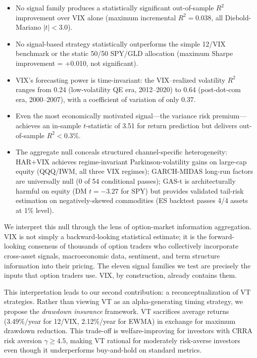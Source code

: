 \documentclass[12pt,a4paper]{article}
\begin{document}
\begin{itemize}
    \item No signal family produces a statistically significant out-of-sample $R^2$ improvement over VIX alone (maximum incremental $R^2 = 0.038$, all Diebold-Mariano $|t| < 3.0$).
    \item No signal-based strategy statistically outperforms the simple 12/VIX benchmark or the static 50/50 SPY/GLD allocation (maximum Sharpe improvement = +0.010, not significant).
    \item VIX's forecasting power is time-invariant: the VIX--realized volatility $R^2$ ranges from 0.24 (low-volatility QE era, 2012--2020) to 0.64 (post-dot-com era, 2000--2007), with a coefficient of variation of only 0.37.
    \item Even the most economically motivated signal---the variance risk premium---achieves an in-sample $t$-statistic of 3.51 for return prediction but delivers out-of-sample $R^2 < 0.3\%$.
    \item The aggregate null conceals structured channel-specific heterogeneity: HAR+VIX achieves regime-invariant Parkinson-volatility gains on large-cap equity (QQQ/IWM, all three VIX regimes); GARCH-MIDAS long-run factors are universally null (0 of 54 conditional passes); GAS-t is architecturally harmful on equity (DM $t = -3.27$ for SPY) but provides validated tail-risk estimation on negatively-skewed commodities (ES backtest passes 4/4 assets at 1\% level).
\end{itemize}

We interpret this null through the lens of option-market information aggregation. VIX is not simply a backward-looking statistical estimate; it is the forward-looking consensus of thousands of option traders who collectively incorporate cross-asset signals, macroeconomic data, sentiment, and term structure information into their pricing. The eleven signal families we test are precisely the inputs that option traders use. VIX, by construction, already contains them.

This interpretation leads to our second contribution: a reconceptualization of VT strategies. Rather than viewing VT as an alpha-generating timing strategy, we propose the \emph{drawdown insurance} framework. VT sacrifices average returns (3.49\%/year for 12/VIX, 2.12\%/year for EWMA) in exchange for maximum drawdown reduction. This trade-off is welfare-improving for investors with CRRA risk aversion $\gamma \geq 4.5$, making VT rational for moderately risk-averse investors even though it underperforms buy-and-hold on standard metrics.
\end{document}
